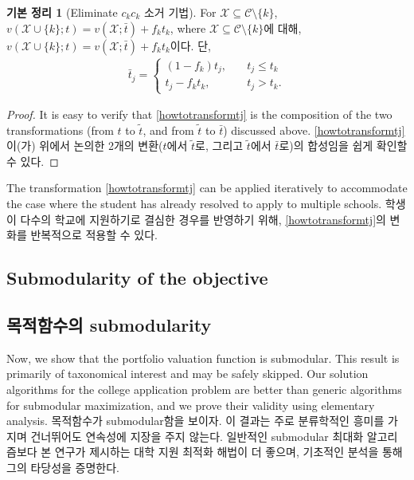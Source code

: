 \documentclass[11pt]{article} %
\newtheorem{lemma}{Lemma}
\theoremstyle{definition}
\newtheorem{lemma}{기본 정리}
\theoremstyle{definition}
\begin{document}
\begin{lemma}[\ifen Eliminate $c_k$\else $c_k$ 소거 기법\fi] \label{eliminationtheorem}
\ifen For $\mathcal{X} \subseteq \mathcal{C} \setminus \{k\}$, $v(\mathcal{X}\cup\{k\}; t)  = v(\mathcal{X}; \bar t) + f_k t_k$, where
\else $\mathcal{X} \subseteq \mathcal{C} \setminus \{k\}$에 대해, $v(\mathcal{X}\cup\{k\}; t)  = v(\mathcal{X}; \bar t) + f_k t_k$이다. 단,\fi
\begin{align}\label{howtotransformtj}
\bar t_j = 
\begin{cases}
(1 - f_k) t_j, \quad & t_j \leq t_k \\
t_j - f_k t_k, \quad& t_j > t_k.
\end{cases}
\end{align}
\end{lemma}

\begin{proof}
\ifen It is easy to verify that \eqref{howtotransformtj} is the composition of the two transformations (from $t$ to $\tilde t$, and from $\tilde t$ to $\bar t$) discussed above.
\else \eqref{howtotransformtj}이(가) 위에서 논의한 2개의 변환($t$에서 $\tilde t$로, 그리고 $\tilde t$에서 $\bar t$로)의 합성임을 쉽게 확인할 수 있다. \fi
\end{proof}

\ifen
\noindent The transformation \eqref{howtotransformtj} can be applied iteratively to accommodate the case where the student has already resolved to apply to multiple schools.
\else
\noindent 학생이 다수의 학교에 지원하기로 결심한 경우를 반영하기 위해, \eqref{howtotransformtj}의 변화를 반복적으로 적용할 수 있다.
\fi


\ifen \subsection{Submodularity of the objective} \else \subsection{목적함수의 submodularity} \fi
\ifen 
Now, we show that the portfolio valuation function is submodular. This result is primarily of taxonomical interest and may be safely skipped. Our solution algorithms for the college application problem are better than generic algorithms for submodular maximization, and we prove their validity using elementary analysis.
\else
목적함수가 submodular함을 보이자. 이 결과는 주로 분류학적인 흥미를 가지며 건너뛰어도 연속성에 지장을 주지 않는다. 일반적인 submodular 최대화 알고리즘보다 본 연구가 제시하는 대학 지원 최적화 해법이 더 좋으며, 기초적인 분석을 통해 그의 타당성을 증명한다.
\fi
\end{document}
